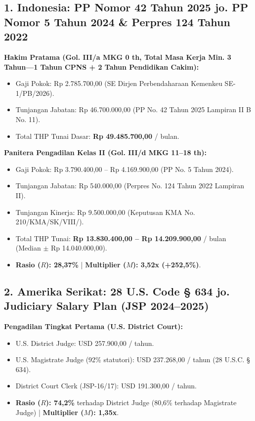 \documentclass[12pt, a4paper]{article}
\begin{document}
\vspace{0.5em}

\subsection*{1. Indonesia: PP Nomor 42 Tahun 2025 jo. PP Nomor 5 Tahun 2024 \& Perpres 124 Tahun 2022}
\noindent\textbf{Hakim Pratama (Gol. III/a MKG 0 th, Total Masa Kerja Min. 3 Tahun---1 Tahun CPNS + 2 Tahun Pendidikan Cakim):}
\begin{itemize}
    \item Gaji Pokok: Rp 2.785.700,00 (SE Dirjen Perbendaharaan Kemenkeu SE-1/PB/2026).
    \item Tunjangan Jabatan: Rp 46.700.000,00 (PP No. 42 Tahun 2025 Lampiran II B No. 11).
    \item Total THP Tunai Dasar: \textbf{Rp 49.485.700,00} / bulan.
\end{itemize}
\noindent\textbf{Panitera Pengadilan Kelas II (Gol. III/d MKG 11--18 th):}
\begin{itemize}
    \item Gaji Pokok: Rp 3.790.400,00 -- Rp 4.169.900,00 (PP No. 5 Tahun 2024).
    \item Tunjangan Jabatan: Rp 540.000,00 (Perpres No. 124 Tahun 2022 Lampiran II).
    \item Tunjangan Kinerja: Rp 9.500.000,00 (Keputusan KMA No. 210/\allowbreak KMA/\allowbreak SK/\allowbreak VIII/).
    \item Total THP Tunai: \textbf{Rp 13.830.400,00 -- Rp 14.209.900,00} / bulan (Median $\pm$ Rp 14.040.000,00).
    \item \textbf{Rasio ($R$): 28,37\%} | \textbf{Multiplier ($M$): 3,52x (+252,5\%)}.
\end{itemize}

\subsection*{2. Amerika Serikat: 28 U.S. Code § 634 jo. Judiciary Salary Plan (JSP 2024--2025)}
\noindent\textbf{Pengadilan Tingkat Pertama (U.S. District Court):}
\begin{itemize}
    \item U.S. District Judge: USD 257.900,00 / tahun.
    \item U.S. Magistrate Judge (92\% statutori): USD 237.268,00 / tahun (28 U.S.C. § 634).
    \item District Court Clerk (JSP-16/17): USD 191.300,00 / tahun.
    \item \textbf{Rasio ($R$): 74,2\%} terhadap District Judge (80,6\% terhadap Magistrate Judge) | \textbf{Multiplier ($M$): 1,35x}.
\end{itemize}
\end{document}
